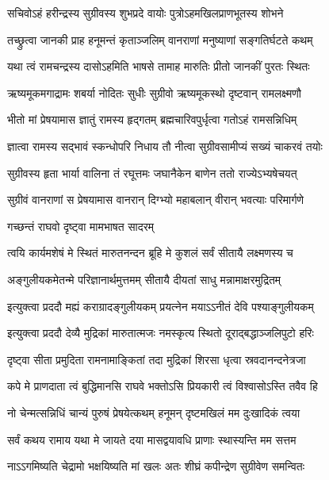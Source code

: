 \twolineshloka
{सचिवोऽहं हरीन्द्रस्य सुग्रीवस्य शुभप्रदे}
{वायोः पुत्रोऽहमखिलप्राणभूतस्य शोभने} %

\twolineshloka
{तच्छ्रुत्वा जानकी प्राह हनूमन्तं कृताञ्जलिम्}
{वानराणां मनुष्याणां सङ्गतिर्घटते कथम्} %

\twolineshloka
{यथा त्वं रामचन्द्रस्य दासोऽहमिति भाषसे}
{तामाह मारुतिः प्रीतो जानकीं पुरतः स्थितः} %

\twolineshloka
{ऋष्यमूकमगाद्रामः शबर्या नोदितः सुधीः}
{सुग्रीवो ऋष्यमूकस्थो दृष्टवान् रामलक्ष्मणौ} %

\twolineshloka
{भीतो मां प्रेषयामास ज्ञातुं रामस्य हृद्गतम्}
{ब्रह्मचारिवपुर्धृत्वा गतोऽहं रामसन्निधिम्} %

\twolineshloka
{ज्ञात्वा रामस्य सद्भावं स्कन्धोपरि निधाय तौ}
{नीत्वा सुग्रीवसामीप्यं सख्यं चाकरवं तयोः} %

\twolineshloka
{सुग्रीवस्य हृता भार्या वालिना तं रघूत्तमः}
{जघानैकेन बाणेन ततो राज्येऽभ्यषेचयत्} %

\twolineshloka
{सुग्रीवं वानराणां स प्रेषयामास वानरान्}
{दिग्भ्यो महाबलान् वीरान् भवत्याः परिमार्गणे} %

\onelineshloka
{गच्छन्तं राघवो दृष्ट्वा मामभाषत सादरम्} %

\twolineshloka
{त्वयि कार्यमशेषं मे स्थितं मारुतनन्दन}
{ब्रूहि मे कुशलं सर्वं सीतायै लक्ष्मणस्य च} %

\twolineshloka
{अङ्गुलीयकमेतन्मे परिज्ञानार्थमुत्तमम्}
{सीतायै दीयतां साधु मन्नामाक्षरमुद्रितम्} %

\twolineshloka
{इत्युक्त्वा प्रददौ मह्यं कराग्रादङ्गुलीयकम्}
{प्रयत्नेन मयाऽऽनीतं देवि पश्याङ्गुलीयकम्} %

\twolineshloka
{इत्युक्त्वा प्रददौ देव्यै मुद्रिकां मारुतात्मजः}
{नमस्कृत्य स्थितो दूराद्बद्धाञ्जलिपुटो हरिः} %

\twolineshloka
{दृष्ट्वा सीता प्रमुदिता रामनामाङ्कितां तदा}
{मुद्रिकां शिरसा धृत्वा स्रवदानन्दनेत्रजा} %

\twolineshloka
{कपे मे प्राणदाता त्वं बुद्धिमानसि राघवे}
{भक्तोऽसि प्रियकारी त्वं विश्वासोऽस्ति तवैव हि} %

\twolineshloka
{नो चेन्मत्सन्निधिं चान्यं पुरुषं प्रेषयेत्कथम्}
{हनूमन् दृष्टमखिलं मम दुःखादिकं त्वया} %

\twolineshloka
{सर्वं कथय रामाय यथा मे जायते दया}
{मासद्वयावधि प्राणाः स्थास्यन्ति मम सत्तम} %

\twolineshloka
{नाऽऽगमिष्यति चेद्रामो भक्षयिष्यति मां खलः}
{अतः शीघ्रं कपीन्द्रेण सुग्रीवेण समन्वितः} %

